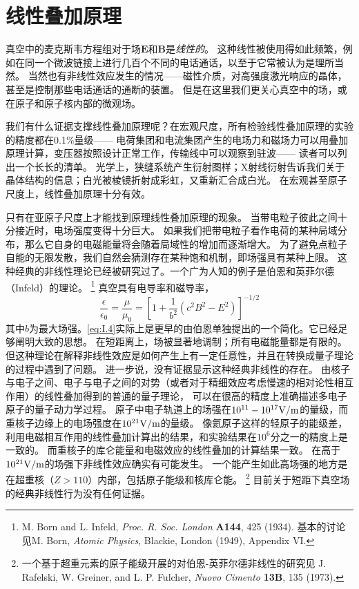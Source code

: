 \documentclass[12pt]{book}
\numberwithin{equation}{chapter}
\numberwithin{figure}{chapter}
\numberwithin{footnote}{page}
\begin{document}
\section{线性叠加原理}\label{sec:I.3}

真空中的麦克斯韦方程组对于场$\mathbf{E}$和$\mathbf{B}$是\textit{线性的}。
这种线性被使用得如此频繁，例如在同一个微波链接上进行几百个不同的电话通话，以至于它常被认为是理所当然。
当然也有非线性效应发生的情况——磁性介质，对高强度激光响应的晶体，甚至是控制那些电话通话的通断的装置。
但是在这里我们更关心真空中的场，或在原子和原子核内部的微观场。

我们有什么证据支撑线性叠加原理呢？在宏观尺度，所有检验线性叠加原理的实验的精度都在0.1\%量级——
电荷集团和电流集团产生的电场力和磁场力可以用叠加原理计算，变压器按照设计正常工作，传输线中可以观察到驻波——
读者可以列出一个长长的清单。
光学上，狭缝系统产生衍射图样；X射线衍射告诉我们关于晶体结构的信息；白光被棱镜折射成彩虹，又重新汇合成白光。
在宏观甚至原子尺度上，线性叠加原理十分有效。

只有在亚原子尺度上才能找到原理线性叠加原理的现象。
当带电粒子彼此之间十分接近时，电场强度变得十分巨大。
如果我们把带电粒子看作电荷的某种局域分布，那么它自身的电磁能量将会随着局域性的增加而逐渐增大。
为了避免点粒子自能的无限发散，我们自然会猜测存在某种饱和机制，即场强具有某种上限。
这种经典的非线性理论已经被研究过了。一个广为人知的例子是伯恩和英菲尔德（Infeld）的理论。
\footnote{M. Born and L. Infeld, \textit{Proc. R. Soc. London} \textbf{A144}, 425 (1934).
    基本的讨论见M. Born, \textit{Atomic Physics}, Blackie, London (1949), Appendix VI.}
真空具有电导率和磁导率，
\begin{equation}\label{eq:I.4}
    \frac{\epsilon}{\epsilon_0}=\frac{\mu}{\mu_0}=[1+\frac{1}{b^2}(c^2B^2-E^2)]^{-1/2}
\end{equation}
其中$b$为最大场强。\autoref{eq:I.4}实际上是更早的由伯恩单独提出的一个简化。它已经足够阐明大致的思想。
在短距离上，场被显著地调制；所有电磁能量都是有限的。
但这种理论在解释非线性效应是如何产生上有一定任意性，并且在转换成量子理论的过程中遇到了问题。
进一步说，没有证据显示这种经典非线性的存在。
由核子与电子之间、电子与电子之间的对势（或者对于精细效应考虑慢速的相对论性相互作用）的线性叠加得到的普通的量子理论，
可以在很高的精度上准确描述多电子原子的量子动力学过程。
原子中电子轨道上的场强在$10^{11}-10^{17}{\rm V/m}$的量级，而重核子边缘上的电场强度在$10^{21}{\rm V/m}$的量级。
像氦原子这样的轻原子的能级差，利用电磁相互作用的线性叠加计算出的结果，和实验结果在$10^6$分之一的精度上是一致的。
而重核子的库仑能量和电磁效应的线性叠加的计算结果一致。
在高于$10^{21}{\rm V/m}$的场强下非线性效应确实有可能发生。
一个能产生如此高场强的地方是在超重核（$Z>110$）内部，包括原子能级和核库仑能。
\footnote{一个基于超重元素的原子能级开展的对伯恩-英菲尔德非线性的研究见
    J. Rafelski, W. Greiner, and L. P. Fulcher, \textit{Nuovo Cimento} \textbf{13B}, 135 (1973).}
目前关于短距下真空场的经典非线性行为没有任何证据。
\end{document}

